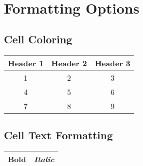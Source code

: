 \documentclass{article}
\begin{document}
\section{Formatting Options}

\subsection{Cell Coloring}

\begin{tabular}{|c|c|c|}
\hline
\rowcolor{gray!20} Header 1 & Header 2 & Header 3 \\
\hline
1 & 2 & 3 \\
\rowcolor{gray!10} 4 & 5 & 6 \\
7 & 8 & 9 \\
\hline
\end{tabular}

\subsection{Cell Text Formatting}

\begin{tabular}{|c|c|}
\hline
\textbf{Bold} & \textit{Italic} \\
\hline
\end{tabular}

\end{document}
